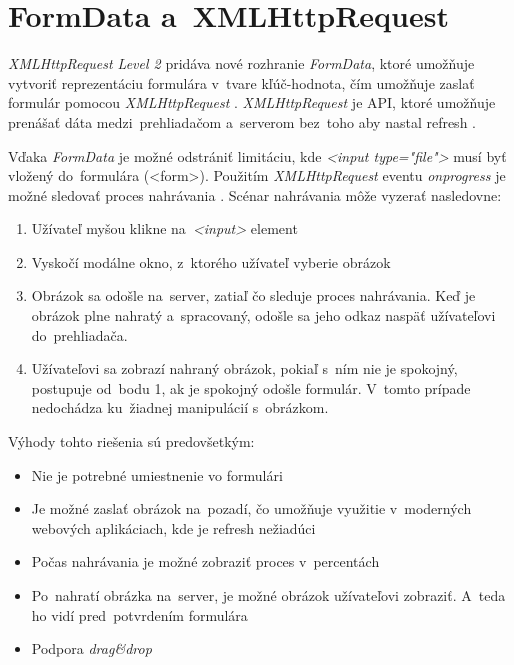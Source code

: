 \section{FormData a~XMLHttpRequest}

\emph{XMLHttpRequest Level 2} pridáva nové rozhranie \emph{FormData}, ktoré umožňuje vytvoriť reprezentáciu formulára v~tvare kľúč-hodnota, čím umožňuje zaslať formulár pomocou \emph{XMLHttpRequest} \cite{MDN_Formdata}. \emph{XMLHttpRequest} je API, ktoré umožňuje prenášať dáta medzi~prehliadačom a~serverom bez~toho aby nastal refresh \cite{MDN_XMLHttpRequest}.

Vďaka \emph{FormData} je možné odstrániť limitáciu, kde \emph{<input type="file"\textgreater} musí byť vložený do~formulára (<form\textgreater). Použitím \emph{XMLHttpRequest} eventu \emph{onprogress} je možné sledovať proces nahrávania \cite{MDN_XMLHttpRequest_progress}. Scénar nahrávania môže vyzerať nasledovne:
\begin{enumerate}
	\item Užívateľ myšou klikne na~\emph{<input>} element
	\item Vyskočí modálne okno, z~ktorého užívateľ vyberie obrázok
	\item Obrázok sa odošle na~server, zatiaľ čo sleduje proces nahrávania. Keď je obrázok plne nahratý a~spracovaný, odošle sa jeho odkaz naspäť užívateľovi do~prehliadača.
	\item Užívateľovi sa zobrazí nahraný obrázok, pokiaľ s~ním nie je spokojný, postupuje od~bodu 1, ak je spokojný odošle formulár. V~tomto prípade nedochádza ku~žiadnej manipulácií s~obrázkom.
\end{enumerate}

Výhody tohto riešenia sú predovšetkým:
\begin{itemize}
	\item Nie je potrebné umiestnenie vo formulári
	\item Je možné zaslať obrázok na~pozadí, čo umožňuje využitie v~moderných webových aplikáciach, kde je refresh nežiadúci
	\item Počas nahrávania je možné zobraziť proces v~percentách
	\item Po~nahratí obrázka na~server, je možné obrázok užívateľovi zobraziť. A~teda ho vidí pred~potvrdením formulára
	\item Podpora \emph{drag&drop}
\end{itemize}

